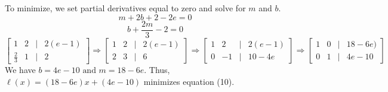 \documentclass[11pt]{article}
\theoremstyle{definition}
\newcommand{\1}[1]{\mathbf{1} \left \{ #1 \right \}}
\begin{document}
To minimize, we set partial derivatives equal to zero and solve for $m$ and $b$.
\[m + 2b + 2 - 2e = 0\]
\[b + \frac{2m}{3} - 2 = 0\]
\[\begin{bmatrix} 1 & 2 & \Big| & 2(e-1) \\
\frac{2}{3} & 1 & \Big| & 2 \end{bmatrix} \Longrightarrow
\begin{bmatrix} 1 & 2 & \Big| & 2(e-1) \\
2 & 3 & \Big| & 6 \end{bmatrix} \Longrightarrow
\begin{bmatrix} 1 & 2 & \Big| & 2(e-1) \\
0 & -1 & \Big| & 10-4e \end{bmatrix} \Longrightarrow
\begin{bmatrix} 1 & 0 & \Big| & 18-6e) \\
0 & 1 & \Big| & 4e-10 \end{bmatrix}\]
We have \(b = 4e - 10 \text{ and } m = 18 - 6e.\) Thus, \(\ell(x) = (18-6e)x + (4e-10)\) minimizes equation (10).
\end{document}
